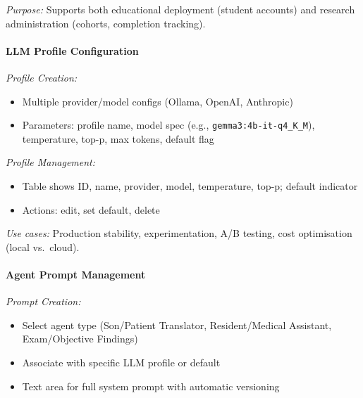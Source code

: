 \textit{Purpose:} Supports both educational deployment (student accounts) and research administration (cohorts, completion tracking).

\paragraph{LLM Profile Configuration}
\textit{Profile Creation:}
\begin{itemize}
  \item Multiple provider/model configs (Ollama, OpenAI, Anthropic)
  \item Parameters: profile name, model spec (e.g., \texttt{gemma3:4b-it-q4\_K\_M}), temperature, top-p, max tokens, default flag
\end{itemize}

\textit{Profile Management:}
\begin{itemize}
  \item Table shows ID, name, provider, model, temperature, top-p; default indicator
  \item Actions: edit, set default, delete
\end{itemize}

\textit{Use cases:} Production stability, experimentation, A/B testing, cost optimisation (local vs.\ cloud).

\paragraph{Agent Prompt Management}
\textit{Prompt Creation:}
\begin{itemize}
  \item Select agent type (Son/Patient Translator, Resident/Medical Assistant, Exam/Objective Findings)
  \item Associate with specific LLM profile or default
  \item Text area for full system prompt with automatic versioning
\end{itemize}

